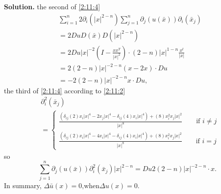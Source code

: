 \message{ !name(21935004-\unexpanded{谭焱}-homework2.tex)}\documentclass[a4paper]{book}
\newenvironment{solution}%
{\noindent\textbf{Solution.}}%
{\qedhere}
\numberwithin{equation}{chapter}
\theoremstyle{definition}
\begin{document}
\begin{multicols}{2}
\begin{solution}
	the second of \ref{2:11:4}
	\begin{equation}
	\begin{aligned} 
		&\sum_{i = 1}^{n} 2\partial_i(|x|^{2-n})\sum_{j = 1}^{n}\partial_j (u(\bar{x}))\partial_i(\bar{x}_j) \\
		&= 2 Du D(\bar{x}) D(|x|^{2-n}) \\
		&= 2 Du |x|^{-2}(I - \frac{xx^T}{|x|^2}) \cdot (2-n)|x|^{1-n}\frac{x^t}{|x|} \\
		&= 2(2-n)|x|^{-2-n}(x - 2x) \cdot Du \\
		&= -2(2-n)|x|^{-2-n} x \cdot Du,
	\end{aligned} 
	\end{equation}
	the third of \ref{2:11:4} according to \ref{2:11:2} 
	\begin{equation}
		\begin{aligned}
		&\partial_i^2(\bar{x}_j) \\
		&=\begin{cases}
		\frac{(\delta_{ij} (2) x_i |x|^4 - 2x_j |x|^4 - \delta_{ij} (4) x_i |x|^4) + (8)x_i^2 x_j |x|^2}{|x|^8} \qquad \text{if } i \neq j \\
		\frac{(\delta_{ij} (2) x_i |x|^4 - 4x_i |x|^4 - \delta_{ij} (4) x_i |x|^4) + (8)x_i^2 x_j |x|^2}{|x|^8} \qquad \text{if } i = j 
		\end{cases} 
		\end{aligned}
	\end{equation}
	so 
	\begin{equation}
		\sum_{j = 1}^{n}\partial_j (u(\bar{x})) \partial_i^2(\bar{x}_j)|x|^{2-n}
		= Du 2(2-n) |x|^{-2-n} \cdot x.
	\end{equation}
	In summary, $\Delta \bar{u}(x) = 0 \text{,when} \Delta u(x) = 0$. 
\end{solution}
%



\end{multicols}
\end{document}
